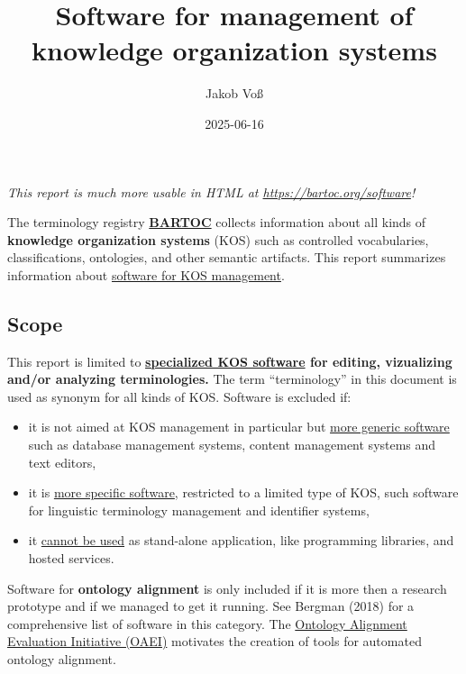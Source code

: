 \documentclass[
  DIV=10]{article}
\title{Software for management of knowledge organization systems}
\author{Jakob Voß}
\affil{%
                  Verbundzentrale des GBV (VZG)
              }
\date{2025-06-16}
\providecommand{\tightlist}{%
  \setlength{\itemsep}{0pt}\setlength{\parskip}{0pt}}
\begin{document}
\maketitle


\large

\emph{This report is much more usable in HTML at
\url{https://bartoc.org/software}!} \vspace*{20mm}

The terminology registry \textbf{\href{https://bartoc.org/}{BARTOC}}
collects information about all kinds of \textbf{knowledge organization
systems} (KOS) such as controlled vocabularies, classifications,
ontologies, and other semantic artifacts. This report summarizes
information about \hyperref[kos-software]{software for KOS management}.

\subsection{Scope}\label{scope}

This report is limited to \textbf{\hyperref[kos-software]{specialized
KOS software} for editing, vizualizing and/or analyzing terminologies.}
The term ``terminology'' in this document is used as synonym for all
kinds of KOS. Software is excluded if:

\begin{itemize}
\tightlist
\item
  it is not aimed at KOS management in particular but
  \hyperref[more-generic-software]{more generic software} such as
  database management systems, content management systems and text
  editors,
\item
  it is \hyperref[more-specific-software]{more specific software},
  restricted to a limited type of KOS, such software for linguistic
  terminology management and identifier systems,
\item
  it \hyperref[limited-use]{cannot be used} as stand-alone application,
  like programming libraries, and hosted services.
\end{itemize}

Software for \textbf{ontology alignment} is only included if it is more
then a research prototype and if we managed to get it running. See
Bergman (2018) for a comprehensive list of software in this category.
The \href{https://oaei.ontologymatching.org/}{Ontology Alignment
Evaluation Initiative (OAEI)} motivates the creation of tools for
automated ontology alignment.

\newpage
{}
\recalctypearea
\end{document}

